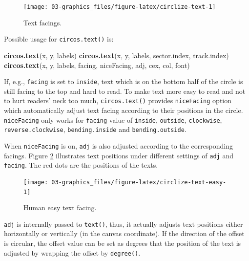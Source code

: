 \documentclass[]{book}
\newenvironment{Shaded}{\begin{snugshade}}{\end{snugshade}}
\newcommand{\KeywordTok}[1]{\textcolor[rgb]{0.13,0.29,0.53}{\textbf{#1}}}
\newcommand{\NormalTok}[1]{#1}
\begin{document}
\begin{figure}

{\centering \texttt{[image: 03-graphics\_files/figure-latex/circlize-text-1]} 

}

\caption{Text facings.}\label{fig:circlize-text}
\end{figure}

Possible usage for \texttt{circos.text()} is:

\begin{Shaded}
\begin{Highlighting}[]
\KeywordTok{circos.text}\NormalTok{(x, y, labels)}
\KeywordTok{circos.text}\NormalTok{(x, y, labels, sector.index, track.index)}
\KeywordTok{circos.text}\NormalTok{(x, y, labels, facing, niceFacing, adj, cex, col, font)}
\end{Highlighting}
\end{Shaded}

If, e.g., \texttt{facing} is set to \texttt{inside}, text which is on
the bottom half of the circle is still facing to the top and hard to
read. To make text more easy to read and not to hurt readers' neck too
much, \texttt{circos.text()} provides \texttt{niceFacing} option which
automatically adjust text facing according to their positions in the
circle. \texttt{niceFacing} only works for \texttt{facing} value of
\texttt{inside}, \texttt{outside}, \texttt{clockwise},
\texttt{reverse.clockwise}, \texttt{bending.inside} and
\texttt{bending.outside}.

When \texttt{niceFacing} is on, \texttt{adj} is also adjusted according
to the corresponding facings. Figure \ref{fig:circlize-text-easy}
illustrates text positions under different settings of \texttt{adj} and
\texttt{facing}. The red dots are the positions of the texts.

\begin{figure}

{\centering \texttt{[image: 03-graphics\_files/figure-latex/circlize-text-easy-1]} 

}

\caption{Human easy text facing.}\label{fig:circlize-text-easy}
\end{figure}

\texttt{adj} is internally passed to \texttt{text()}, thus, it actually
adjusts text positions either horizontally or vertically (in the canvas
coordinate). If the direction of the offset is circular, the offset
value can be set as degrees that the position of the text is adjusted by
wrapping the offset by \texttt{degree()}.
\end{document}
